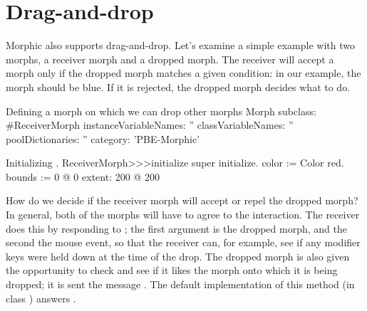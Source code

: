 \documentclass[a4paper,10pt,twoside]{book}
\begin{document}


\section{Drag-and-drop}

Morphic also supports drag-and-drop. Let's examine a simple example with two morphs, a receiver morph and a dropped morph. 
The receiver will accept a morph only if the dropped morph matches a given condition: in our example,  the morph should be blue. If it is rejected, the dropped morph decides what to do.

\begin{classdef}{Defining a morph on which we can drop other morphs}
Morph subclass: #ReceiverMorph
	instanceVariableNames: ''
	classVariableNames: ''
	poolDictionaries: ''
	category: 'PBE-Morphic'
\end{classdef}

\begin{method}{Initializing .}
ReceiverMorph>>>initialize
	super initialize.
	color := Color red.
	bounds := 0 @ 0 extent: 200 @ 200
\end{method}

How do we decide if the receiver morph will accept or repel the dropped morph?
In general, both of the morphs will have to agree to the interaction.
The receiver does this by responding to ; the first argument is the dropped morph, and the second the mouse event, so that the receiver can, for example, see if any modifier keys were held down at the time of the drop. 
The dropped morph is also given the opportunity to check and see if it likes the morph onto which it is being dropped; it is sent the message .  The default implementation of  this method (in class ) answers .
\end{document}
